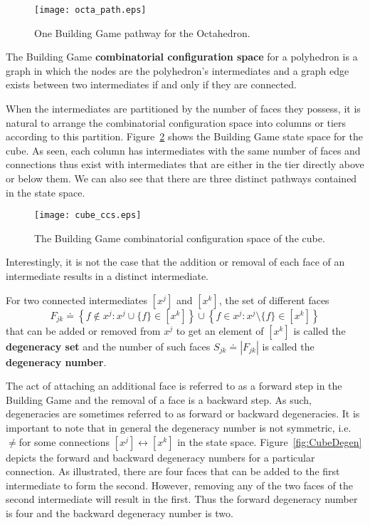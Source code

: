 \begin{figure}[ht]
\centering
\texttt{[image: octa\_path.eps]}
\caption{One Building Game pathway for the Octahedron.}
\label{fig:OctaPath}
\end{figure}

\begin{mydef}
The Building Game \textbf{combinatorial configuration space} for a polyhedron is a graph in which the nodes are the polyhedron's intermediates and a graph edge exists between two intermediates if and only if they are connected. 
\end{mydef}

When the intermediates are partitioned by the number of faces they possess, it is natural to arrange the combinatorial configuration space into columns or tiers according to this partition. Figure~\ref{fig:CubeCCS} shows the Building Game state space for the cube. As seen, each column has intermediates with the same number of faces and connections thus exist with intermediates that are either in the tier directly above or below them. We can also see that there are three distinct pathways contained in the state space. 

\begin{figure}[ht]
\centering
\texttt{[image: cube\_ccs.eps]}
\caption{The Building Game combinatorial configuration space of the cube.}
\label{fig:CubeCCS}    
\end{figure}

Interestingly, it is not the case that the addition or removal of each face of an intermediate results in a distinct intermediate. 
\begin{mydef}
For two connected intermediates $[x^j]$ and $[x^k]$, the set of different faces $$F_{jk} \doteq \left\{f \notin x^j : x^j\cup\{f\} \in [x^k]\right\}\cup\left\{f \in x^j : x^j\setminus\{f\} \in [x^k]\right\}$$ that can be added or removed from $x^j$ to get an element of $[x^k]$ is called the \textbf{degeneracy set} and the number of such faces $S_{jk} \doteq \left|F_{jk}\right|$ is called the \textbf{degeneracy number}.
\end{mydef}

The act of attaching an additional face is referred to as a forward step in the Building Game and the removal of a face is a backward step. As such, degeneracies are sometimes referred to as forward or backward degeneracies. It is important to note that in general the degeneracy number is not symmetric, i.e. \Sjk$\neq$\Skj\spc for some connections $[x^j] \leftrightarrow [x^k]$ in the state space. Figure~\ref{fig:CubeDegen} depicts the forward and backward degeneracy numbers for a particular connection. As illustrated, there are four faces that can be added to the first intermediate to form the second. However, removing any of the two faces of the second intermediate will result in the first. Thus the forward degeneracy number is four and the backward degeneracy number is two.  


